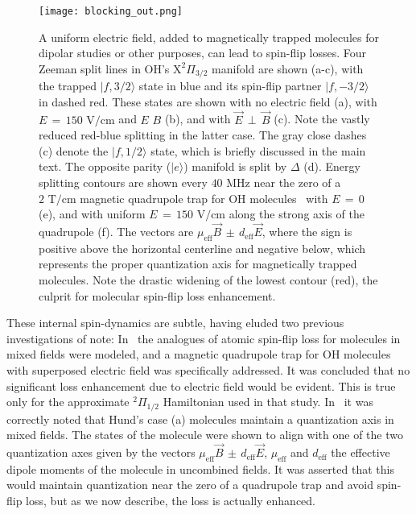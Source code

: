 \documentclass[%
 reprint,
 amsmath,amssymb,
 aps,
prl,
]{revtex4-1}
\newcommand{\epb}{{$\vec{E}\,{\perp}\,\vec{B}$}}
\begin{document}
\begin{figure}[tb]
\texttt{[image: blocking\_out.png]}%
\caption{
A uniform electric field, added to magnetically trapped molecules for dipolar studies or other purposes, can lead to spin-flip losses. 
Four Zeeman split lines in OH's $\mathrm{X}^2\Pi_{3/2}$ manifold are shown (a-c), with the trapped $|f,3/2\rangle$ state in blue and its spin-flip partner $|f,-3/2\rangle$ in dashed red. 
These states are shown with no electric field (a), with $E\,{=}\,150\text{ V/cm}$ and $E\,$\raisebox{1px}{${\parallel}$}$\,B$ (b), and with \epb{} (c). 
Note the vastly reduced red-blue splitting in the latter case. 
The gray close dashes (c) denote the $|f,1/2\rangle$ state, which is briefly discussed in the main text.
The opposite parity ($|e\rangle$) manifold is split by $\Delta$ (d). 
Energy splitting contours are shown every $40\text{ MHz}$ near the zero of a $2\text{ T/cm}$ magnetic quadrupole trap for OH molecules~\cite{Stuhl2012uwave} with $E\,{=}\,0$ (e), and with uniform $E\,{=}\,150\text{ V/cm}$ along the strong axis of the quadrupole (f). 
The vectors are $\mu_\text{eff}\vec{B}\,{\pm}\, d_\text{eff}\vec{E}$, where the sign is positive above the horizontal centerline and negative below, which  represents the proper quantization axis for magnetically trapped molecules. 
Note the drastic widening of the lowest contour (red), the culprit for molecular spin-flip loss enhancement.
}
\label{fig:blocking}
\end{figure}

These internal spin-dynamics are subtle, having eluded two previous investigations of note: In~\cite{Lara2008} the analogues of atomic spin-flip loss for molecules in mixed fields were modeled, and a magnetic quadrupole trap for OH molecules with superposed electric field was specifically addressed. 
It was concluded that no significant loss enhancement due to electric field would be evident. 
This is true only for the approximate $^2\Pi_{1/2}$ Hamiltonian used in that study. 
In~\cite{Bohn2013} it was correctly noted that Hund's case (a) molecules maintain a quantization axis in mixed fields. 
The states of the molecule were shown to align with one of the two quantization axes given by the vectors $\mu_\text{eff}\vec{B}\,{\pm}\, d_\text{eff}\vec{E}$, $\mu_\text{eff}$ and $d_\text{eff}$ the effective dipole moments of the molecule in uncombined fields. 
It was asserted that this would maintain quantization near the zero of a quadrupole trap and avoid spin-flip loss, but as we now describe, the loss is actually enhanced.
\end{document}
